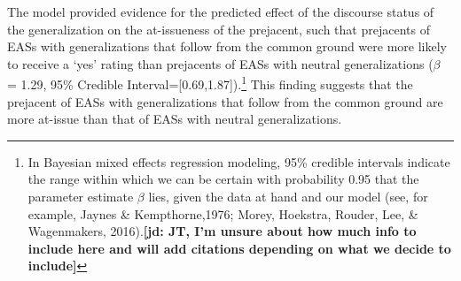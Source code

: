 \documentclass[11pt,fleqn]{article}
\newcommand{\6}{\mbox{$[\hspace*{-.6mm}[$}}
\newcommand{\9}{\mbox{$]\hspace*{-.6mm}]$}}
\newcommand{\jd}[1]{\textbf{\color{green}[jd: #1]}}
\begin{document}
The model provided evidence for the predicted effect of the discourse status of the generalization on the at-issueness of the prejacent, such that  prejacents of EASs with generalizations that follow from the common ground were more likely to receive a `yes' rating than prejacents of EASs with neutral generalizations  ($\beta$ = 1.29, 95\% Credible Interval={[}0.69,1.87{]}).\footnote{In Bayesian mixed effects regression modeling, 95\% credible intervals indicate the range within which we can be certain with probability 0.95 that the parameter estimate $\beta$  lies, given the data at hand and our model (see, for example, Jaynes \& Kempthorne,1976;  Morey, Hoekstra, Rouder, Lee, \& Wagenmakers, 2016).\jd{JT, I'm unsure about how much info to include here and will add citations depending on what we decide to include}} This finding suggests that the prejacent of EASs with generalizations that follow from the common ground are more at-issue than that of EASs with neutral generalizations. 
\end{document}
